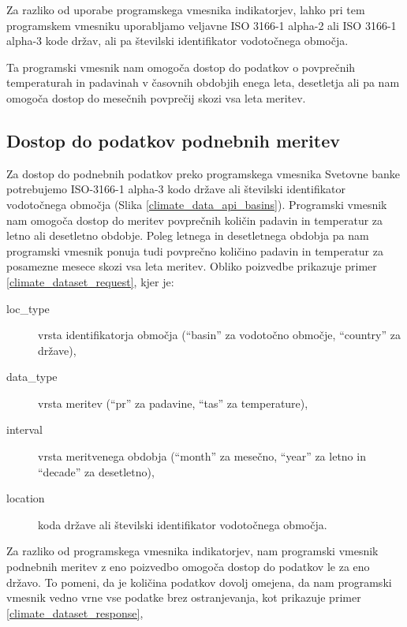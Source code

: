 Za razliko od uporabe programskega vmesnika indikatorjev, lahko pri tem
programskem vmesniku uporabljamo veljavne ISO 3166-1 alpha-2 ali ISO 3166-1 
alpha-3 kode držav, ali pa številski identifikator vodotočnega 
območja.

Ta programski vmesnik nam omogoča dostop do podatkov o povprečnih 
temperaturah in padavinah v časovnih obdobjih enega leta, desetletja ali pa 
nam omogoča dostop do mesečnih povprečij skozi vsa leta meritev.


\subsection{Dostop do podatkov podnebnih meritev}

Za dostop do podnebnih podatkov preko programskega vmesnika Svetovne banke
potrebujemo ISO-3166-1 alpha-3 kodo države ali številski identifikator
vodotočnega območja (Slika \ref{climate_data_api_basins}). Programski vmesnik
nam omogoča dostop do meritev povprečnih količin padavin in temperatur za 
letno ali desetletno obdobje. Poleg letnega in desetletnega obdobja pa nam 
programski vmesnik ponuja tudi povprečno količino padavin in temperatur za 
posamezne mesece skozi vsa leta meritev. Obliko poizvedbe prikazuje primer 
\ref{climate_dataset_request}, kjer je:
\begin{description}
\item [loc\_type] vrsta identifikatorja območja (``basin'' za vodotočno območje, 
  ``country'' za države),
\item [data\_type] vrsta meritev (``pr'' za padavine, ``tas'' za temperature),
\item [interval] vrsta meritvenega obdobja (``month'' za mesečno, ``year'' za letno in
  ``decade'' za desetletno),
\item [location] koda države ali številski identifikator vodotočnega območja.
\end{description}
Za razliko od programskega vmesnika indikatorjev, nam programski vmesnik
podnebnih meritev z eno poizvedbo omogoča dostop do podatkov le za eno državo.
To pomeni, da je količina podatkov dovolj omejena, da nam programski vmesnik
vedno vrne vse podatke brez ostranjevanja, kot prikazuje primer 
\ref{climate_dataset_response},



